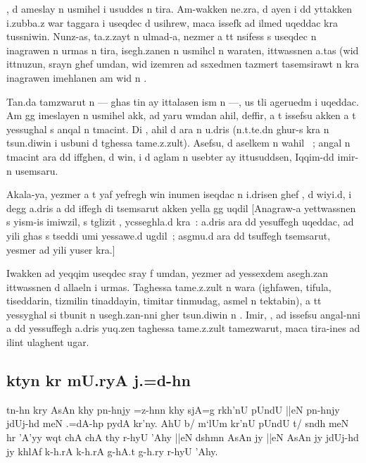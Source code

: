 \documentclass[a4paper,11pt]{article}
\begin{document}
\OMEGA, d ameslay n usmihel i usuddes n tira. Am-wakken ne.zra, d ayen
i dd yttakken i.zubba.z war taggara i useqdec d usihrew, maca issefk
ad ilmed uqeddac kra tussniwin. Nunz-as, ta.z.zayt n ulmad-a, nezmer a
tt nsifess s useqdec n inagrawen n urmas n tira, isegh.zanen n usmihcl
n waraten, ittwassnen a.tas (wid ittnuzun, srayn ghef umdan, wid
izemren ad ssxedmen tazmert tasemsirawt n kra inagrawen imehlanen am
wid n .

Tan.da tamzwarut n \OMEGA{} --- ghas tin ay ittalasen ism n \OMEGA{}
---, us tli ageruedm i uqeddac. Am gg imeslayen n usmihel akk, ad yaru
wmdan ahil, deffir, a t issefsu akken a t yessughal s anqal n
tmacint. Di \OMEGA{}, ahil d ara n u.dris (n.t.te.dn ghur-s kra n
tsun.diwin i usbuni d tghessa tame.z.zult).  Asefsu, d aselkem n wahil
\OMEGA~; angal n tmacint ara dd iffghen, d win, i d aglam n usebter ay
ittusuddsen, Iqqim-dd imir-n usemsaru.

Akala-ya, yezmer a t yaf yefregh win inumen iseqdac n i.drisen ghef
, d wiyi.d, i degg a.dris a dd iffegh di
tsemsarut akken yella gg uqdil [Anagraw-a yettwassnen s yism-is
imiwzil, s tglizit , ycsseghla.d kra~: a.dris
ara dd yesuffegh uqeddac, ad yili ghas s tseddi umi yessawe.d ugdil~;
asgmu.d ara dd tsuffegh tsemsarut, yesmer ad yili yuser kra.]

Iwakken ad yeqqim useqdec sray f umdan, yezmer ad yessexdem asegh.zan
ittwassnen d allaeln i urmas. Taghessa tame.z.zult n wara (ighfawen,
tifula, tiseddarin, tizmilin tinaddayin, timitar tinmudag, asmel n
tektabin), a tt yessyghal si tbunit n usegh.zan-nni gher tsun.diwin n
\OMEGA. Imir, \OMEGA, ad issefsu angal-nni a dd yessuffegh a.dris
yuq.zen taghessa tame.z.zult tamezwarut, maca tira-ines ad ilint
ulaghent ugar.  \popocplist

\pushocplist\SindhiOCP
\subsection{ktyn kr mU.ryA j.=d-hn}


tn-hn kry AsAn khy pn-hnjy =z-hnn khy sjA=g rkh'nU pUndU ||eN pn-hnjy
jdUj-hd meN .=dA-hp pydA kr'ny. AhU b/ m`lUm kr'nU pUndU t/ sndh meN
hr 'A'yy wqt chA chA thy r-hyU 'Ahy ||eN dshmn AsAn jy ||eN AsAn jy
jdUj-hd jy khlAf k-h.rA k-h.rA g-hA.t g-h.ry r-hyU 'Ahy.
\end{document}
